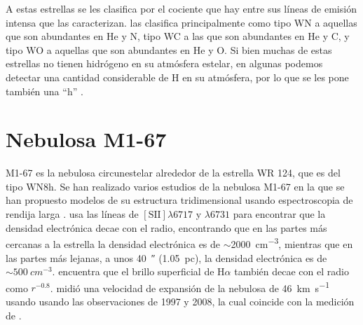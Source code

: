 \documentclass{book}
\begin{document}
A estas estrellas se les clasifica por el cociente que hay entre sus
líneas de emisión intensa que las caracterizan.
\cite{VanDerHutch:2001} las clasifica principalmente como tipo WN a
aquellas que son abundantes en He y N, tipo WC a las que son
abundantes en He y C, y tipo WO a aquellas que son abundantes en He y
O. Si bien muchas de estas estrellas no tienen hidrógeno en su
atmósfera estelar, en algunas podemos detectar una cantidad
considerable de H en su atmósfera, por lo que se les pone también una
``h'' \citep{SSM:1996}.



\section{Nebulosa M1-67}

M1-67 es la nebulosa circunestelar alrededor de la estrella WR 124,
que es del tipo WN8h. Se han realizado varios estudios de la nebulosa
M1-67 en la que se han propuesto modelos de su estructura
tridimensional usando espectroscopia de rendija larga
\citep{Zavala:2022}. \cite{Marcel:2021} usa las líneas de
$[\mathrm{S \scriptstyle{II}}]\lambda6717$ y $\lambda6731$ para encontrar que la
densidad electrónica decae con el radio, encontrando que en las partes
más cercanas a la estrella la densidad electrónica es de
$\sim$\SI{2000}{cm^{-3}}, mientras que en las partes más lejanas, a unos
\SI{40}{\arcsecond} (\SI{1.05}{pc}), la densidad electrónica es de
$\sim\SI{500}{cm^{-3}}$. \cite{Grosdidier:1998} encuentra que el brillo
superficial de H$\alpha$ también decae con el radio como $r^{-0.8}$.
\cite{Mancherko:2010} midió una velocidad de expansión de la nebulosa
de \SI{46}{km.s^{-1}} usando usando las observaciones de 1997
\citep{Grosdidier:1998} y 2008, la cual coincide con la medición de
\cite{Zavala:2022}.
\end{document}
